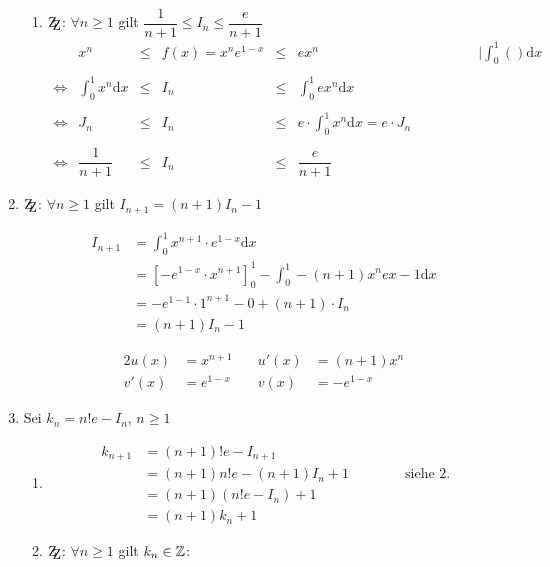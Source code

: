 \documentclass[main.tex]{subfiles}
\begin{document}
\begin{Beweis}
\begin{enumerate}
\begin{enumerate}
				\item $\zz$: $\forall n\geq1$ gilt $\dfrac{1}{n+1}\leq I_n \leq \dfrac{e}{n+1}$
					$$\begin{array}{ccccccl}
						&x^n&\leq& f(x)=x^ne^{1-x}&\leq& ex^n& \qquad\qquad|\int_0^1()\text{d}x\\\\
						\Leftrightarrow&\int_0^1 x^n\text{d}x &\leq& I_n &\leq& \int_0^1 ex^n\text{d}x&\\\\
						\Leftrightarrow&J_n &\leq& I_n &\leq& e\cdot\int_0^1x^n\text{d}x=e\cdot J_n&\\\\
						\Leftrightarrow&\dfrac{1}{n+1}&\leq& I_n &\leq&  \dfrac{e}{n+1}&
					\end{array}$$
			\end{enumerate}
		\item $\zz$: $\forall n\geq 1$ gilt $I_{n+1}=(n+1)I_n-1$
		
			\begin{minipage}{0.55\textwidth}
			\begin{align*}
			I_{n+1}&=\int_0^1x^{n+1}\cdot e^{1-x}\mbox{d}x\\
			&=\left[-e^{1-x}\cdot x^{n+1}\right]_0^1-\int_0^1-(n+1)x^ne{x-1}\mbox{d}x\\
			&=-e^{1-1}\cdot 1^{n+1}-0+(n+1)\cdot I_n\\
			&=(n+1)I_n-1
			\end{align*}
			\end{minipage}
			\begin{minipage}{0.45\textwidth}
			\begin{alignat*}{2}
			u(x)&=x^{n+1}\quad& u\prime(x)&=(n+1)x^n\\
			v'(x)&=e^{1-x}\quad & v(x)&=-e^{1-x}
			\end{alignat*}
			\end{minipage}
		\item Sei $k_n=n!e-I_n$, $n\geq1$
			\begin{enumerate}
				\item
					\begin{align*}
					k_{n+1}&=(n+1)!e-I_{n+1}\\
					&=(n+1)n!e-(n+1)I_n+1\qquad\qquad\mbox{siehe 2.}\\
					&=(n+1)(n!e-I_n)+1\\
					&=(n+1)k_n+1
					\end{align*}
				\item $\zz$: $\forall n\geq1$ gilt $k_n\in\mathbb{Z}$:
				

\end{enumerate}
\end{enumerate}
\end{Beweis}
\end{document}
